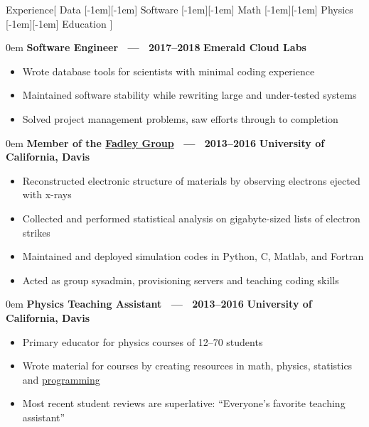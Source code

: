 \documentclass[11pt,a4paper]{article}
\newenvironment{headedsection}[2]{
    \begin{addmargin}[0.5em]{0em}
    {\large\bfseries #1} \hfill {\bfseries #2}%
    \begin{itemize}
        [label={}, topsep=0pt, itemsep=1.5pt, parsep=0pt, leftmargin=1.5em]
}{
    \end{itemize}
    \end{addmargin}
    \medskip
}
\newcommand*\sbull{%
    \raisebox{-0.550ex}[-1em][-1em]{\textscale{2}{\( \cdot \)}}\xspace
}
\begin{document}
\sloppy  %


\vspace{1em}

\begin{mysection}{Experience}[
    Data \sbull{} Software \sbull{} Math \sbull{} Physics \sbull{} Education
]

    \begin{headedsection}
        {Software Engineer \ --- \ 2017--2018}{Emerald Cloud Labs}

        \item Wrote database tools for scientists with minimal coding
            experience
        \item Maintained software stability while rewriting large and
            under-tested systems
        \item Solved project management problems, saw efforts through to
            completion
    \end{headedsection}

    \begin{headedsection}
          {Member of the
            \href{http://www.physics.ucdavis.edu/fadleygroup/}{Fadley Group}
             \ --- \ 2013--2016}
          {University of California, Davis}

        \item Reconstructed electronic structure of materials by observing
            electrons ejected with x-rays
        \item Collected and performed statistical analysis on gigabyte-sized
            lists of electron strikes
        \item Maintained and deployed simulation codes in Python, C, Matlab,
            and Fortran
        \item Acted as group sysadmin, provisioning servers and teaching coding
             skills
    \end{headedsection}

    \begin{headedsection}
          {Physics Teaching Assistant  \ --- \ 2013--2016}
          {University of California, Davis}

        \item Primary educator for physics courses of 12--70 students
        \item Wrote material for courses by creating resources in math, physics,
            statistics and
            \href{https://github.com/jgarst/AdvancedLab/releases/download/spring_2016/Python-FirstSteps.pdf}
                {programming}
        \item Most recent student reviews are superlative:
            ``Everyone's favorite teaching assistant''
    \end{headedsection}


\end{mysection}
\end{document}
